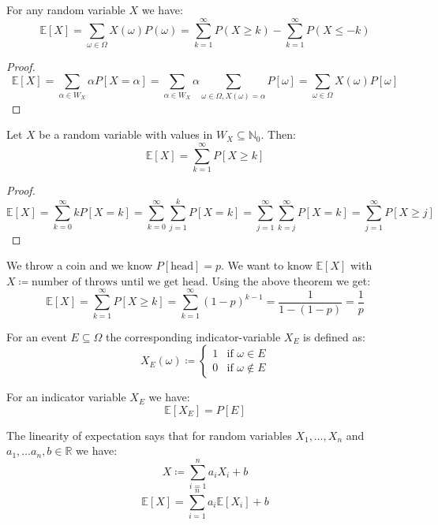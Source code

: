 \begin{lemma}
	For any random variable $X$ we have:
	$$ \mathbb{E}[X] = \sum_{\omega \in \Omega} X(\omega) P(\omega) = \sum_{k=1}^\infty P(X \geq k) - \sum_{k=1}^\infty P(X \leq -k) $$
\end{lemma}

\begin{proof}
	$$\mathbb{E}[X] = \sum_{\alpha \in W_X}\alpha P[X=\alpha] = \sum_{\alpha \in W_X}\alpha\sum_{\omega \in \Omega, X(\omega)=\alpha} P[\omega] = \sum_{\omega \in \Omega} X(\omega) P[\omega]$$
\end{proof}

\begin{theorem}
	Let $X$ be a random variable with values in $W_X \subseteq \mathbb{N}_0$. Then:
	$$\mathbb{E}[X] = \sum_{k=1}^\infty P[X \geq k]$$
\end{theorem}

\begin{proof}
	$$\mathbb{E}[X] = \sum_{k=0}^\infty k P[X=k] = \sum_{k=0}^\infty \sum_{j=1}^k P[X=k] = \sum_{j=1}^\infty \sum_{k=j}^\infty P[X=k] = \sum_{j=1}^\infty P[X \geq j]$$
\end{proof}

\begin{example}
	We throw a coin and we know $P[\text{head}] = p$. We want to know $\mathbb{E}[X]$ with $X \coloneqq \text{number of throws until we get head}$. Using the above theorem we get:
	$$\mathbb{E}[X] = \sum_{k=1}^\infty P[X \geq k] = \sum_{k=1}^\infty (1-p)^{k-1} = \frac{1}{1-(1-p)} = \frac{1}{p}$$
\end{example}

\begin{definition}
	For an event $E \subseteq \Omega$ the corresponding indicator-variable $X_E$ is defined as:
	$$ X_E(\omega) \coloneqq \begin{cases} 1 & \text{if } \omega \in E \\ 0 & \text{if } \omega \notin E \end{cases}$$
\end{definition}

\begin{remark}
	For an indicator variable $X_E$ we have:
	$$\mathbb{E}[X_E] = P[E]$$
\end{remark}

\begin{theorem}
	The linearity of expectation says that for random variables $X_1, \dots, X_n$  and $a_1, \dots a_n, b \in \mathbb{R}$ we have:
	$$X \coloneqq \sum_{i=1}^n a_i X_i + b$$
	$$\mathbb{E}[X] = \sum_{i=1}^n a_i \mathbb{E}[X_i] + b$$
\end{theorem}

